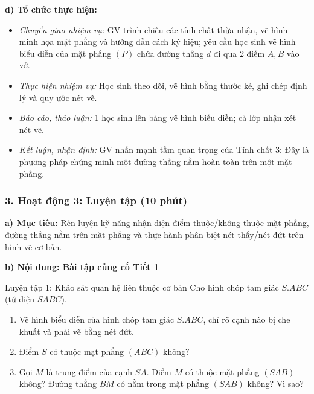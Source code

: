 \documentclass[12pt, a4paper]{article}
\begin{document}
\noindent \textbf{d) Tổ chức thực hiện:}
\begin{itemize}[leftmargin=0.8cm]
    \item \textit{Chuyển giao nhiệm vụ:} GV trình chiếu các tính chất thừa nhận, vẽ hình minh họa mặt phẳng và hướng dẫn cách ký hiệu; yêu cầu học sinh vẽ hình biểu diễn của mặt phẳng $(P)$ chứa đường thẳng $d$ đi qua 2 điểm $A, B$ vào vở.
    \item \textit{Thực hiện nhiệm vụ:} Học sinh theo dõi, vẽ hình bằng thước kẻ, ghi chép định lý và quy ước nét vẽ.
    \item \textit{Báo cáo, thảo luận:} 1 học sinh lên bảng vẽ hình biểu diễn; cả lớp nhận xét nét vẽ.
    \item \textit{Kết luận, nhận định:} GV nhấn mạnh tầm quan trọng của Tính chất 3: Đây là phương pháp chứng minh một đường thẳng nằm hoàn toàn trên một mặt phẳng.
\end{itemize}

\subsubsection*{3. Hoạt động 3: Luyện tập (10 phút)}

\noindent \textbf{a) Mục tiêu:}
Rèn luyện kỹ năng nhận diện điểm thuộc/không thuộc mặt phẳng, đường thẳng nằm trên mặt phẳng và thực hành phân biệt nét thấy/nét đứt trên hình vẽ cơ bản.

\noindent \textbf{b) Nội dung: Bài tập củng cố Tiết 1}
\begin{pedabox}{Luyện tập 1: Khảo sát quan hệ liên thuộc cơ bản}
Cho hình chóp tam giác $S.ABC$ (tứ diện $SABC$).
\begin{enumerate}[leftmargin=0.6cm]
    \item Vẽ hình biểu diễn của hình chóp tam giác $S.ABC$, chỉ rõ cạnh nào bị che khuất và phải vẽ bằng nét đứt.
    \item Điểm $S$ có thuộc mặt phẳng $(ABC)$ không?
    \item Gọi $M$ là trung điểm của cạnh $SA$. Điểm $M$ có thuộc mặt phẳng $(SAB)$ không? Đường thẳng $BM$ có nằm trong mặt phẳng $(SAB)$ không? Vì sao?
\end{enumerate}
\end{pedabox}
\end{document}
